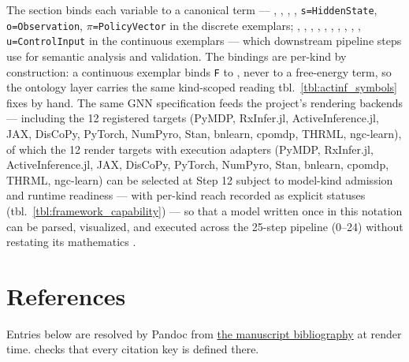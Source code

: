 \documentclass[
  english,
  9pt,
]{extarticle}
\begin{document}
The  section binds each variable
to a canonical term --- ,
, ,
, \texttt{s=HiddenState},
\texttt{o=Observation}, \texttt{\texorpdfstring{\ensuremath{\pi}}{pi}=PolicyVector} in the discrete
exemplars; ,
, ,
, ,
, ,
, ,
, \texttt{u=ControlInput} in the
continuous exemplars --- which downstream pipeline steps use for
semantic analysis and validation. The bindings are per-kind by
construction: a continuous exemplar binds \texttt{F} to
, never to a free-energy term, so the
ontology layer carries the same kind-scoped reading
tbl.~\ref{tbl:actinf_symbols} fixes by hand. The same GNN specification
feeds the project's rendering backends --- including the 12 registered
targets (PyMDP, RxInfer.jl, ActiveInference.jl, JAX, DisCoPy, PyTorch,
NumPyro, Stan, bnlearn, cpomdp, THRML, ngc-learn), of which the 12
render targets with execution adapters (PyMDP, RxInfer.jl,
ActiveInference.jl, JAX, DisCoPy, PyTorch, NumPyro, Stan, bnlearn,
cpomdp, THRML, ngc-learn) can be selected at Step 12 subject to
model-kind admission and runtime readiness --- with per-kind reach
recorded as explicit statuses (tbl.~\ref{tbl:framework_capability}) ---
so that a model written once in this notation can be parsed, visualized,
and executed across the 25-step pipeline (0--24) without restating its
mathematics \citep{gnn2023, heins2022, defelice2021}.

\newpage

\section{References}\label{sec:references}

Entries below are resolved by Pandoc from
\href{https://github.com/ActiveInferenceInstitute/Generalized_Notation_Notation/blob/main/docs/manuscript/references.bib}{the
manuscript bibliography} at render time.
 checks that every citation
key is defined there.



\providecommand{\bibsection}{}
\renewcommand{\bibsection}{}


\end{document}
